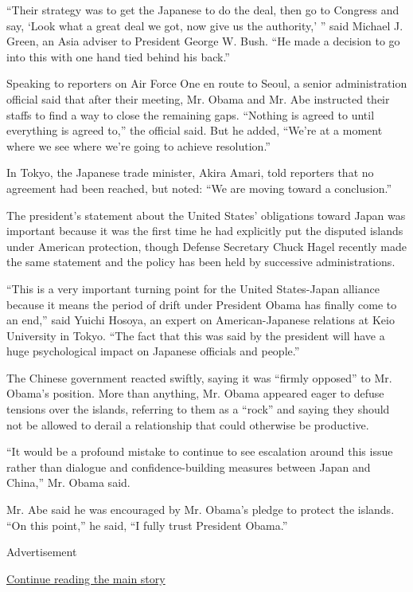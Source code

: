 ``Their strategy was to get the Japanese to do the deal, then go to
Congress and say, `Look what a great deal we got, now give us the
authority,' '' said Michael J. Green, an Asia adviser to President
George W. Bush. ``He made a decision to go into this with one hand tied
behind his back.''

Speaking to reporters on Air Force One en route to Seoul, a senior
administration official said that after their meeting, Mr. Obama and Mr.
Abe instructed their staffs to find a way to close the remaining gaps.
``Nothing is agreed to until everything is agreed to,'' the official
said. But he added, ``We're at a moment where we see where we're going
to achieve resolution.''

In Tokyo, the Japanese trade minister, Akira Amari, told reporters that
no agreement had been reached, but noted: ``We are moving toward a
conclusion.''

The president's statement about the United States' obligations toward
Japan was important because it was the first time he had explicitly put
the disputed islands under American protection, though Defense Secretary
Chuck Hagel recently made the same statement and the policy has been
held by successive administrations.

``This is a very important turning point for the United States-Japan
alliance because it means the period of drift under President Obama has
finally come to an end,'' said Yuichi Hosoya, an expert on
American-Japanese relations at Keio University in Tokyo. ``The fact that
this was said by the president will have a huge psychological impact on
Japanese officials and people.''

The Chinese government reacted swiftly, saying it was ``firmly opposed''
to Mr. Obama's position. More than anything, Mr. Obama appeared eager to
defuse tensions over the islands, referring to them as a ``rock'' and
saying they should not be allowed to derail a relationship that could
otherwise be productive.

``It would be a profound mistake to continue to see escalation around
this issue rather than dialogue and confidence-building measures between
Japan and China,'' Mr. Obama said.

Mr. Abe said he was encouraged by Mr. Obama's pledge to protect the
islands. ``On this point,'' he said, ``I fully trust President Obama.''

Advertisement

\protect\hyperlink{after-bottom}{Continue reading the main story}

